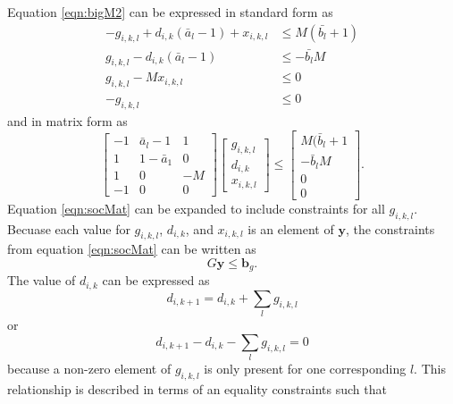 \par Equation \ref{eqn:bigM2} can be expressed in standard form as 
\begin{equation}\label{eqn:chargeConstraints}
	\begin{aligned} 
		-g_{i,k,l} + d_{i,k}(\bar{a}_l - 1) + x_{i,k,l} &\le M(\bar{b_l} + 1) \\
		 g_{i,k,l} - d_{i,k}(\bar{a}_l - 1)  &\le  - \bar{b_l}M \\
		 g_{i,k,l} - Mx_{i,k,l} &\le 0 \\
		-g_{i,k,l} &\le 0  
	\end{aligned}
\end{equation} 
and in matrix form as
\begin{equation}\label{eqn:socMat}
	\begin{bmatrix}
		-1 & \bar{a}_l - 1 & 1 \\
		1 & 1 - \bar{a}_1 & 0\\
		1 & 0 & -M \\
		-1 & 0 & 0
	\end{bmatrix}
	\begin{bmatrix}
		g_{i,k,l} \\
		d_{i,k}\\
		x_{i,k,l}
	\end{bmatrix}
	\le 
	\begin{bmatrix}
		M(\bar{b}_l + 1 \\
		-\bar{b}_lM\\
		0\\
		0
	\end{bmatrix}.
\end{equation}
Equation \ref{eqn:socMat} can be expanded to include constraints for all $g_{i,k,l}$.  Becuase each value for $g_{i,k,l}$, $d_{i,k}$, and $x_{i,k,l}$ is an element of $\mathbf{y}$, the constraints from equation \ref{eqn:socMat} can be written as 
\begin{equation}\label{eqn:dSocMat}
	G\mathbf{y} \le \mathbf{b}_g.
\end{equation}
The value of $d_{i,k}$ can be expressed as 
\begin{equation}\label{eqn:totalG}
	d_{i,k + 1} = d_{i,k} + \sum_l g_{i,k,l} 
\end{equation}
or 
\begin{equation}
	d_{i,k + 1} - d_{i,k} - \sum_l g_{i,k,l} = 0
\end{equation}
because a non-zero element of $g_{i,k,l}$ is only present for one corresponding $l$. This relationship is described in terms of an equality constraints such that
